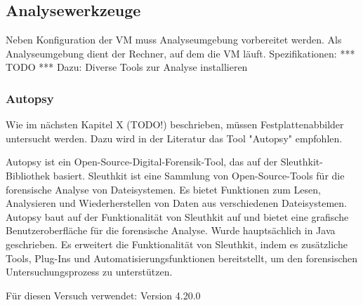 \subsection{Analysewerkzeuge}

Neben Konfiguration der VM muss Analyseumgebung vorbereitet werden.
Als Analyseumgebung dient der Rechner, auf dem die VM läuft.
Spezifikationen: *** TODO ***
Dazu: Diverse Tools zur Analyse installieren

\subsubsection*{Autopsy}
Wie im nächsten Kapitel X (TODO!) beschrieben, müssen Festplattenabbilder untersucht werden.
Dazu wird in der Literatur das Tool "Autopsy" empfohlen.

Autopsy ist ein Open-Source-Digital-Forensik-Tool, das auf der Sleuthkit-Bibliothek basiert. 
Sleuthkit ist eine Sammlung von Open-Source-Tools für die forensische Analyse von Dateisystemen. Es bietet Funktionen zum Lesen, Analysieren und Wiederherstellen von Daten aus verschiedenen Dateisystemen. 
Autopsy baut auf der Funktionalität von Sleuthkit auf und bietet eine grafische Benutzeroberfläche für die forensische Analyse. 
Wurde hauptsächlich in Java geschrieben.
Es erweitert die Funktionalität von Sleuthkit, indem es zusätzliche Tools, Plug-Ins und Automatisierungsfunktionen bereitstellt, um den forensischen Untersuchungsprozess zu unterstützen.
 
Für diesen Versuch verwendet: Version 4.20.0

